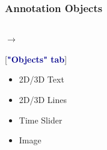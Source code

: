 \begin{frame}
\frametitle{Annotation Objects}
\begin{columns}
\begin{column}{5.5cm}
        \textcolor{DarkBlue}{}
         $\rightarrow$ 

        \hspace{5mm}
        [\textcolor{DarkBlue}{\bf "Objects" tab}]

        \begin{itemize}
                \item 2D/3D Text
		\item 2D/3D Lines
                \item Time Slider
		\item Image
        \end{itemize}


\end{column}
\end{columns}
\end{frame}
